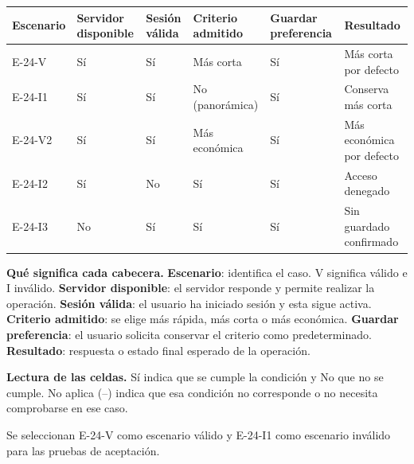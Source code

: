 \begingroup\fontsize{7.8}{11}\selectfont\setlength{\tabcolsep}{3pt}
\begin{tabularx}{\linewidth}{@{}*{6}{Y}@{}}\toprule
\textbf{Escenario} & \textbf{Servidor disponible} & \textbf{Sesión válida} & \textbf{Criterio admitido} & \textbf{Guardar preferencia} & \textbf{Resultado}\\\midrule
E-24-V & Sí & Sí & Más corta & Sí & Más corta por defecto\\[3pt]
E-24-I1 & Sí & Sí & No (panorámica) & Sí & Conserva más corta\\[3pt]
E-24-V2 & Sí & Sí & Más económica & Sí & Más económica por defecto\\[3pt]
E-24-I2 & Sí & No & Sí & Sí & Acceso denegado\\[3pt]
E-24-I3 & No & Sí & Sí & Sí & Sin guardado confirmado\\[3pt]
\bottomrule\end{tabularx}\endgroup\par
{\fontsize{9}{11}\selectfont\textbf{Qué significa cada cabecera.} \textbf{Escenario}: identifica el caso. V significa válido e I inválido. \textbf{Servidor disponible}: el servidor responde y permite realizar la operación. \textbf{Sesión válida}: el usuario ha iniciado sesión y esta sigue activa. \textbf{Criterio admitido}: se elige más rápida, más corta o más económica. \textbf{Guardar preferencia}: el usuario solicita conservar el criterio como predeterminado. \textbf{Resultado}: respuesta o estado final esperado de la operación.\par\textbf{Lectura de las celdas.} Sí indica que se cumple la condición y No que no se cumple. No aplica (--) indica que esa condición no corresponde o no necesita comprobarse en ese caso.\par}


Se seleccionan E-24-V como escenario válido y E-24-I1 como escenario inválido para las pruebas de aceptación.\par



